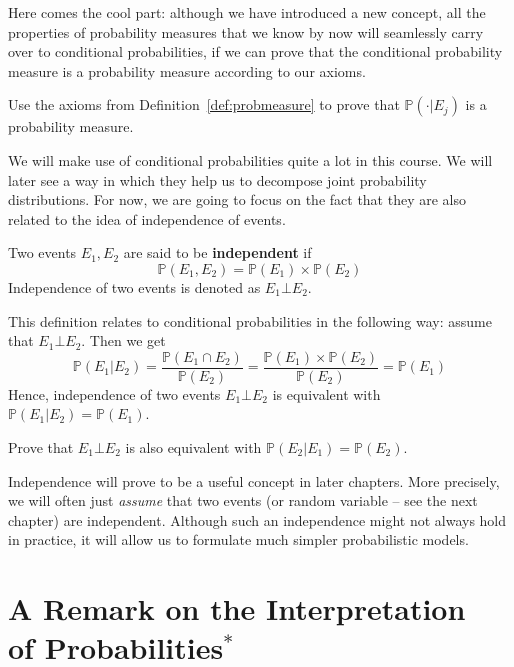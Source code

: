 \documentclass[a4paper,11pt,leqno]{report}
\begin{document}
Here comes the cool part: although we have introduced a new concept, all the properties of probability
measures that we know by now will seamlessly carry over to conditional probabilities, if we can prove
that the conditional probability measure is a probability measure according to our axioms.

\begin{Exercise}
Use the axioms from Definition~\ref{def:probmeasure} to prove that $ \mathbb{P}(\cdot|E_{j}) $ is a probability measure.
\end{Exercise} 

We will make use of conditional probabilities quite a lot in this course. We will later see a way in which
they help us to decompose joint probability distributions. For now, we are going to focus on the fact that
they are also related to the idea of independence of events.

\begin{Definition}
Two events $ E_{1}, E_{2} $ are said to be \textbf{independent} if 
$$ \mathbb{P}(E_{1}, E_{2}) = \mathbb{P}(E_{1}) \times \mathbb{P}(E_{2}) $$
Independence of two events is denoted as $ E_{1} \bot E_{2} $.
\end{Definition}

This definition relates to conditional probabilities in the following way: assume that $ E_{1} \bot E_{2} $.
Then we get
\begin{equation}
\mathbb{P}(E_{1}|E_{2}) = \dfrac{\mathbb{P}(E_{1} \cap E_{2})}{\mathbb{P}(E_{2})}
= \dfrac{\mathbb{P}(E_{1}) \times \mathbb{P}(E_{2})}{\mathbb{P}(E_{2})} = \mathbb{P}(E_{1})
\end{equation}
Hence, independence of two events $ E_{1} \bot E_{2}$ is equivalent with 
$\mathbb{P}(E_{1}|E_{2}) = \mathbb{P}(E_{1}) $.

\begin{Exercise}
Prove that $E_1 \bot E_2$ is also equivalent with $\mathbb{P}(E_{2}|E_{1}) = \mathbb{P}(E_{2}) $.
\end{Exercise}

Independence will prove to be a useful concept in later chapters. More precisely, we will often
just \textit{assume} that two events (or random variable -- see the next chapter) are independent. Although
such an independence might not always hold in practice, it will allow us to formulate much simpler probabilistic models.


\section{A Remark on the Interpretation \\ of Probabilities$^{*}$}
\end{document}
